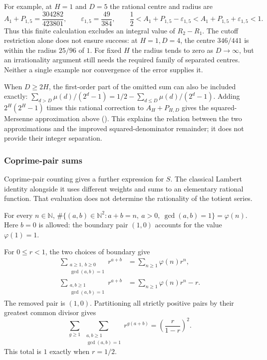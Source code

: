 For example, at $H=1$ and $D=5$ the rational centre and radius are
\[
 A_1+P_{1,5}=\frac{304282}{423801},\qquad
 \varepsilon_{1,5}=\frac{49}{384},\qquad
 \frac12<A_1+P_{1,5}-\varepsilon_{1,5}
          <A_1+P_{1,5}+\varepsilon_{1,5}<1.
\]
Thus this finite calculation excludes an integral value of $R_2-R_1$.
The cutoff restriction alone does not ensure success: at $H=1,D=4$,
the centre $346/441$ is within the radius $25/96$ of $1$.
For fixed $H$ the radius tends to zero as $D\to\infty$, but an
irrationality argument still needs the required family of separated
centres. Neither a single example nor convergence of the error supplies it.

When $D\ge2H$, the first-order part of the omitted sum can also be
included exactly:
$\sum_{d>D}\mu(d)/(2^d-1)=1/2-\sum_{d\le D}\mu(d)/(2^d-1)$.
Adding $2^H(2^H-1)$ times this rational correction to $A_H+P_{H,D}$
gives the squared-Mersenne approximation above
(). This explains the
relation between the two approximations and the improved squared-denominator
remainder; it does not provide their integer separation.

\subsubsection{Coprime-pair sums}

Coprime-pair counting gives a further expression for $S$. The classical
Lambert identity alongside it uses different weights and sums to an
elementary rational function. That evaluation does not determine the
rationality of the totient series.


\begin{thm}\label{thm:coprime-pair-counting-totient}
For every $n\in\mathbb N$,
$\#\{(a,b)\in\mathbb N^2:a+b=n,\ a>0,\ \gcd(a,b)=1\}=\varphi(n)$.
Here $b=0$ is allowed: the boundary pair $(1,0)$ accounts for the value
$\varphi(1)=1$.
\end{thm}

\begin{prop}\label{prop:two-lattice-sums}
For $0\le r<1$, the two choices of boundary give
\[
\begin{aligned}
 \sum_{\substack{a\ge1,\ b\ge0\\\gcd(a,b)=1}}r^{a+b}
   &=\sum_{n\ge1}\varphi(n)r^n,\\
 \sum_{\substack{a,b\ge1\\\gcd(a,b)=1}}r^{a+b}
   &=\sum_{n\ge1}\varphi(n)r^n-r.
\end{aligned}
\]
The removed pair is $(1,0)$. Partitioning all strictly positive pairs
by their greatest common divisor gives
\[
 \sum_{g\ge1}\ \sum_{\substack{a,b\ge1\\\gcd(a,b)=1}}
       r^{g(a+b)}=\left(\frac r{1-r}\right)^2.
\]
This total is $1$ exactly when $r=1/2$.
\end{prop}

